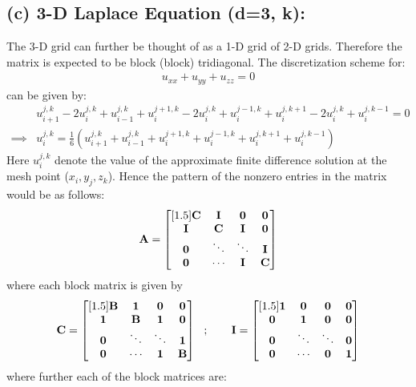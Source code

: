 \subsection*{(c) 3-D Laplace Equation (d=3, k): }
The 3-D grid can further be thought of as a 1-D grid of 2-D grids. Therefore the matrix is expected to be block (block) tridiagonal. The discretization scheme for:  
\begin{align*}
u_{xx} + u_{yy} + u_{zz} = 0
\end{align*}
can be given by: 
\begin{align*}
& u^{j,k}_{i+1} - 2  u^{j,k}_{i} + u^{j,k}_{i-1} + u^{j+1,k}_i - 2u^{j,k}_i + u^{j-1,k}_i +  u^{j,k+1}_i - 2u^{j,k}_i + u^{j,k-1}_i = 0 \\
\implies 
& 
u^{j,k}_i 
=
\frac{1}{6}
\left(
u^{j,k}_{i+1} + u^{j,k}_{i-1} + u^{j+1,k}_i + u^{j-1,k}_i +  u^{j,k+1}_i + u^{j,k-1}_i
\right)
\end{align*}
Here $u^{j,k}_i$ denote the value of the approximate finite difference solution at the mesh point ($x_i,y_j,z_k$). Hence the pattern of the nonzero entries in the matrix would be as follows: 
\begin{align*}
{\bf A} = \begin{bmatrix}[1.5]
{\bf C}  & {\bf I} & \bf 0 & \bf 0\\
{\bf I} & {\bf C} & {\bf I} & \bf 0\\
\bf 0 & \ddots & \ddots & {\bf I}\\
\bf 0 & \cdots & {\bf I} & {\bf C}
\end{bmatrix}
\end{align*}
where each block matrix is given by 
\begin{align*}
{\bf C} = \begin{bmatrix}[1.5]
{\bf B}  & {\bf 1} & \bf 0 & \bf 0\\
{\bf 1} & {\bf B} & {\bf 1} & \bf 0\\
\bf 0 & \ddots & \ddots & {\bf 1}\\
\bf 0 & \cdots & {\bf 1} & {\bf B}
\end{bmatrix} \ \ ; \ \ \ \ \ \ 
{\bf I} 
=
\begin{bmatrix}[1.5]
{\bf 1}  & {\bf 0} & \bf 0 & \bf 0\\
{\bf 0} & {\bf 1} & {\bf 0} & \bf 0\\
\bf 0 & \ddots & \ddots & {\bf 0}\\
\bf 0 & \cdots & {\bf 0} & {\bf 1}
\end{bmatrix}
\end{align*}
where further each of the block matrices are: 
